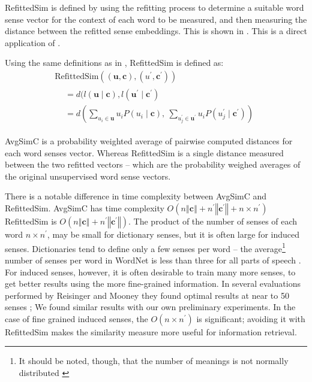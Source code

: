 \documentclass{sig-alternate}
\renewcommand{\c}{\mathbf{c}}
\renewcommand{\u}{\mathbf{u}}
\begin{document}
RefittedSim is defined by using the refitting process to determine a suitable word sense vector for the context of each word to be measured, and then measuring the distance between the refitted sense embeddings. This is shown in .
This is a direct application of  . 

Using the same definitions as in , RefittedSim is defined as:
\begin{multline} \label{eq:refittedsim}
\mathrm{RefittedSim}((\u,\c),(u^{\prime},\c^{\prime}))\\
\begin{aligned}
&= d(l(\u \mid \c), l(\u^\prime \mid \c^\prime)\\
&= d\left(
\sum_{u_{i}\in\u}u_{i}P(u_{i}\mid\c),\:
\sum_{u_{j}^{\prime}\in\u^{\prime}}u_{i}P(u_{j}^{\prime}\mid\c^{\prime})\right)
\end{aligned}
\end{multline}

AvgSimC is a probability weighted average of pairwise computed distances for each word senses vector.
Whereas RefittedSim is a single distance measured between the two refitted vectors -- which are the probability weighed averages of the original unsupervised word sense vectors.


There is a notable difference in time complexity between AvgSimC and RefittedSim.
AvgSimC has time complexity $O(n\left\Vert \c\right\Vert +n^{\prime}\left\Vert \c^{\prime}\right\Vert +n\times n^{\prime})$
RefittedSim is $O(n\left\Vert \c\right\Vert +n^{\prime}\left\Vert \c^{\prime}\right\Vert)$.
The product of the number of senses of each word $n \times n^\prime$, may be small for dictionary senses, but it is often large for induced senses. Dictionaries tend to define only a few senses per word -- the average\footnote{It should be noted, though, that the number of meanings is not normally distributed \parencite{zipf1945meaning}} number of senses per word in WordNet is less than three for all parts of speech \parencite{miller1995wordnet}. For induced senses, however, it is often desirable to train many more senses, to get better results using the more fine-grained information. In several evaluations performed by Reisinger and Mooney they found optimal results at near to 50 senses \parencite{Reisinger2010}; We found similar results with our own preliminary experiments. In the case of fine grained induced senses, the $O(n \times n^\prime)$ is significant; avoiding it with RefittedSim makes the similarity measure more useful for information retrieval.
\end{document}
